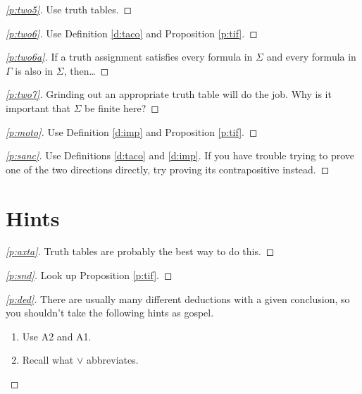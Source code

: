 \documentclass[12pt]{amsbook}
\theoremstyle{plain}
\theoremstyle{definition}
\theoremstyle{remark}
\newenvironment{clue}[1]%
{\begin{proof}[\ref{#1}]}%
{\renewcommand{\qed}{}\end{proof}}
\begin{document}
\begin{clue}{p:two5}
Use truth tables.
\end{clue}

\begin{clue}{p:two6}
Use Definition \ref{d:taco} and Proposition \ref{p:tif}.
\end{clue}

\begin{clue}{p:two6a}
If a truth assignment satisfies every formula in $\Sigma$ and every formula in $\Gamma$ is also in $\Sigma$,  then\dots
\end{clue}

\begin{clue}{p:two7}
Grinding out an appropriate truth table will do the job.  Why is it important that $\Sigma$ be finite here?
\end{clue}

\begin{clue}{p:moto}
Use Definition \ref{d:imp} and Proposition \ref{p:tif}.
\end{clue}

\begin{clue}{p:sanc}
Use Definitions \ref{d:taco} and \ref{d:imp}.  If you have trouble trying to prove one of the two directions directly,  try proving its contrapositive instead.
\end{clue}



%
%

\chapter{Hints}

\begin{clue}{p:axta}
Truth tables are probably the best way to do this.
\end{clue}

\begin{clue}{p:snd}
Look up Proposition \ref{p:tif}.
\end{clue}

\begin{clue}{p:ded}
There are usually many different deductions with a given conclusion,  so you shouldn't take the following hints as gospel.
\begin{enumerate}
\item Use A2 and A1.
\item Recall what $\lor$ abbreviates.
\end{enumerate}
\end{clue}
\end{document}
